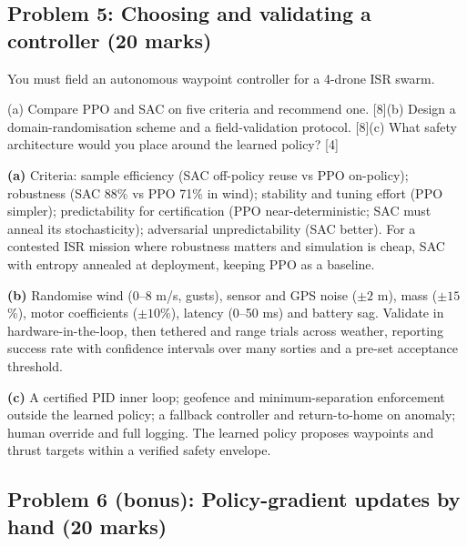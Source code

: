 \documentclass[11pt]{article}
\begin{document}
\subsection{Problem 5: Choosing and validating a controller \normalfont\small\color{GreyN}(20 marks)}

\begin{prob}You must field an autonomous waypoint controller for a 4-drone ISR swarm.

(a) Compare PPO and SAC on five criteria and recommend one. [8]\newline (b) Design a domain-randomisation scheme and a field-validation protocol. [8]\newline (c) What safety architecture would you place around the learned policy? [4]\end{prob}

\begin{soln}\textbf{(a)} Criteria: sample efficiency (SAC off-policy reuse vs PPO on-policy); robustness (SAC 88\% vs PPO 71\% in wind); stability and tuning effort (PPO simpler); predictability for certification (PPO near-deterministic; SAC must anneal its stochasticity); adversarial unpredictability (SAC better). For a contested ISR mission where robustness matters and simulation is cheap, SAC with entropy annealed at deployment, keeping PPO as a baseline.

\textbf{(b)} Randomise wind (0--8 m/s, gusts), sensor and GPS noise ($\pm2$ m), mass ($\pm15$\%), motor coefficients ($\pm10$\%), latency (0--50 ms) and battery sag. Validate in hardware-in-the-loop, then tethered and range trials across weather, reporting success rate with confidence intervals over many sorties and a pre-set acceptance threshold.

\textbf{(c)} A certified PID inner loop; geofence and minimum-separation enforcement outside the learned policy; a fallback controller and return-to-home on anomaly; human override and full logging. The learned policy proposes waypoints and thrust targets within a verified safety envelope.\end{soln}

\subsection{Problem 6 (bonus): Policy-gradient updates by hand \normalfont\small\color{GreyN}(20 marks)}
\end{document}
